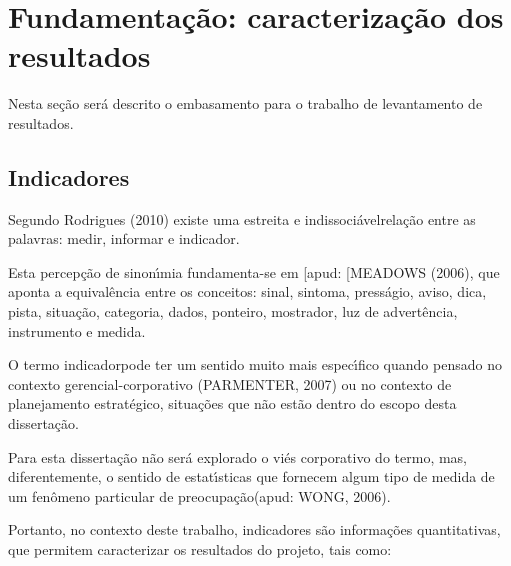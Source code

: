 \documentclass[
12pt,		%
openright,	%
twoside,  %
a4paper,			%
chapter=TITLE,		%
english,			%
french,				%
spanish,			%
brazil				%
]{USPSC-classe/USPSC_RedarTex}
\begin{document}
\section[Fundamenta\c{c}\~ao: caracteriza\c{c}\~ao dos resultados]{Fundamenta\c{c}\~ao: caracteriza\c{c}\~ao dos resultados}\label{Fundamenta\c{c}\~ao: caracteriza\c{c}\~ao dos resultados}
Nesta se\c{c}\~ao ser\'a descrito o embasamento para o trabalho de levantamento de resultados.








\subsection[Indicadores]{Indicadores}\label{Indicadores}
Segundo  Rodrigues (2010)  existe uma \textquotedbl estreita e indissoci\'avel\textquotedbl  rela\c{c}\~ao entre as palavras: medir, informar e indicador.








Esta percep\c{c}\~ao de sinon\'{\i}mia fundamenta-se em [apud: [MEADOWS (2006), que aponta a equival\^encia entre os conceitos: sinal, sintoma, press\'agio, aviso, dica, pista, situa\c{c}\~ao, categoria, dados, ponteiro, mostrador, luz de advert\^encia, instrumento e medida.








O termo \textquotedbl indicador\textquotedbl  pode ter um sentido muito mais espec\'{\i}fico quando pensado no contexto gerencial-corporativo (PARMENTER, 2007) ou no contexto de planejamento estrat\'egico, situa\c{c}\~oes que n\~ao est\~ao dentro do escopo desta disserta\c{c}\~ao.








Para esta disserta\c{c}\~ao n\~ao ser\'a explorado o vi\'es corporativo do termo, mas, diferentemente, o sentido de \textquotedbl estat\'{\i}sticas que fornecem algum tipo de medida de um fen\^omeno particular de preocupa\c{c}\~ao\textquotedbl  (apud: WONG, 2006).








Portanto, no contexto deste trabalho, indicadores s\~ao informa\c{c}\~oes quantitativas, que permitem caracterizar os resultados do projeto, tais como:
\end{document}

